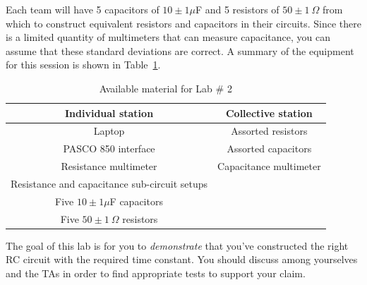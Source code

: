 \documentclass[12pt]{report}
\def\anhkhoi#1{{\color{purple}[#1]}}
\begin{document}
%
%

Each team will have 5 capacitors of $10\pm 1\mu$F and 5 resistors of $50\pm 1 \ \Omega$ from which to construct equivalent resistors and capacitors in their circuits. Since there is a limited quantity of multimeters that can measure capacitance, you can assume that these standard deviations are correct.
A summary of the equipment for this session is shown in Table~\ref{Tab:Lab2-material}.
\begin{table}[h]
\centering
\begin{tabular}{||c | c ||}
\hline
Individual station & Collective station\\ \hline
Laptop & Assorted resistors \\
PASCO 850 interface & Assorted capacitors \\
Resistance multimeter & Capacitance multimeter \\
Resistance and capacitance sub-circuit setups & \\
Five $10\pm 1 \mu$F capacitors & \\
Five $50 \pm 1 \ \Omega$ resistors &  \\
\hline
\end{tabular}
\caption{Available material for Lab \# 2}
\label{Tab:Lab2-material}
\end{table}

{\color{blue}The goal of this lab is for you to \textit{demonstrate} that you've constructed the right RC circuit with the required time constant. 
You should discuss among yourselves and the TAs in order to find appropriate tests to support your claim.}
\end{document}
